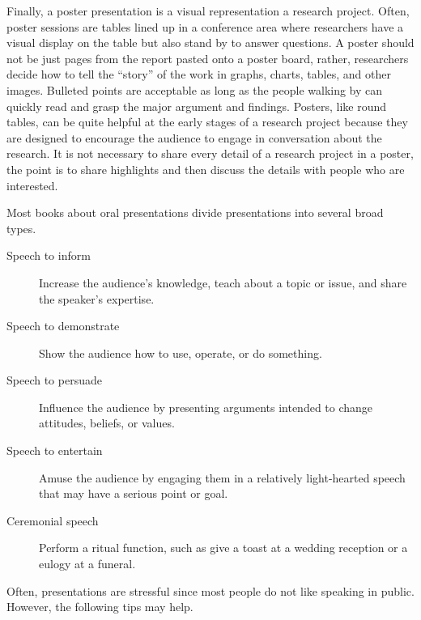 Finally, a poster presentation is a visual representation a research project. Often, poster sessions are tables lined up in a conference area where researchers have a visual display on the table but also stand by to answer questions. A poster should not be just pages from the report pasted onto a poster board, rather, researchers decide how to tell the ``story'' of the work in graphs, charts, tables, and other images. Bulleted points are acceptable as long as the people walking by can quickly read and grasp the major argument and findings. Posters, like round tables, can be quite helpful at the early stages of a research project because they are designed to encourage the audience to engage in conversation about the research. It is not necessary to share every detail of a research project in a poster, the point is to share highlights and then discuss the details with people who are interested.

Most books about oral presentations divide presentations into several broad types.

\begin{description}
	\item[Speech to inform] Increase the audience's knowledge, teach about a topic
	or issue, and share the speaker's expertise.
	\item[Speech to demonstrate] Show the audience how to use, operate, or do
	something.
	\item[Speech to persuade] Influence the audience by presenting arguments
	intended to change attitudes, beliefs, or values.
	\item[Speech to entertain] Amuse the audience by engaging them in a
	relatively light-hearted speech that may have a serious point or goal.
	\item[Ceremonial speech] Perform a ritual function, such as give a toast at a
	wedding reception or a eulogy at a funeral.
\end{description}

Often, presentations are stressful since most people do not like speaking in public. However, the following tips may help.

